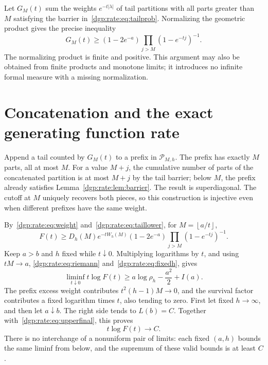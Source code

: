 \documentclass[11pt,letterpaper]{article}
\numberwithin{equation}{section}
\theoremstyle{remark}\newtheorem{remark}[theorem]{Remark}
\newcommand{\floor}[1]{\left\lfloor #1\right\rfloor}
\begin{document}
Let $G_M(t)$ sum the weights $e^{-t|\lambda|}$ of tail partitions with
all parts greater than $M$ satisfying the barrier in~\eqref{dgp:rate:eq:tailprob}.
Normalizing the geometric product gives the precise inequality
\begin{equation}\label{dgp:rate:eq:taillower}
 G_M(t)\geq(1-2e^{-a})\prod_{j>M}(1-e^{-tj})^{-1}.
\end{equation}
The normalizing product is finite and positive. This argument may also
be obtained from finite products and monotone limits; it introduces no
infinite formal measure with a missing normalization.

\section{Concatenation and the exact generating function rate}\label{dgp:rate:sec:concat}
Append a tail counted by $G_M(t)$ to a prefix in $\mathcal P_{M,h}$.
The prefix has exactly $M$ parts, all at most $M$. For a value $M+j$,
the cumulative number of parts of the concatenated partition is at most
$M+j$ by the tail barrier; below $M$, the prefix already satisfies
Lemma~\ref{dgp:rate:lem:barrier}. The result is superdiagonal.
The cutoff at $M$ uniquely recovers both pieces, so this construction is
injective even when different prefixes have the same weight.

By~\eqref{dgp:rate:eq:weight} and~\eqref{dgp:rate:eq:taillower}, for $M=\floor{a/t}$,
\begin{equation}\label{dgp:rate:eq:concat}
 F(t)\geq D_h(M)e^{-tW_h(M)}(1-2e^{-a})
          \prod_{j>M}(1-e^{-tj})^{-1}.
\end{equation}
Keep $a>b$ and $h$ fixed while $t\downarrow0$. Multiplying logarithms by
$t$, and using $tM\to a$, \eqref{dgp:rate:eq:riemann} and~\eqref{dgp:rate:eq:fixedh}, gives
\begin{equation}\label{dgp:rate:eq:liminffixed}
 \liminf_{t\downarrow0}t\log F(t)
 \geq a\log\rho_h-\frac{a^2}2+I(a).
\end{equation}
The prefix excess weight contributes $t^2(h-1)M\to0$, and the survival
factor contributes a fixed logarithm times $t$, also tending to zero.
First let fixed $h\to\infty$, and then let $a\downarrow b$. The right
side tends to $L(b)=C$. Together with~\eqref{dgp:rate:eq:upperfinal}, this proves
\begin{equation}\label{dgp:rate:eq:gflimit}
 t\log F(t)\longrightarrow C.
\end{equation}
There is no interchange of a nonuniform pair of limits: each fixed
$(a,h)$ bounds the same liminf from below, and the supremum of these valid
bounds is at least $C$.
\end{document}
